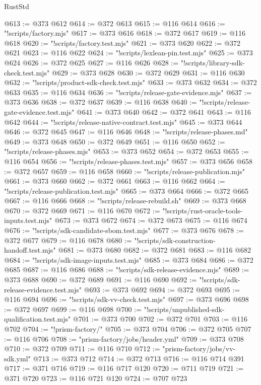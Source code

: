 \begin{lexlean}{RustStd}
\begin{coremodule}
@613 := @373 @612
@614 := @372 @613
@615 := @116 @614
@616 := "!scripts/factory.mjs"
@617 := @373 @616
@618 := @372 @617
@619 := @116 @618
@620 := "!scripts/factory.test.mjs"
@621 := @373 @620
@622 := @372 @621
@623 := @116 @622
@624 := "!scripts/lexlean-pin.test.mjs"
@625 := @373 @624
@626 := @372 @625
@627 := @116 @626
@628 := "!scripts/library-sdk-check.test.mjs"
@629 := @373 @628
@630 := @372 @629
@631 := @116 @630
@632 := "!scripts/product-sdk-check.test.mjs"
@633 := @373 @632
@634 := @372 @633
@635 := @116 @634
@636 := "!scripts/release-gate-evidence.mjs"
@637 := @373 @636
@638 := @372 @637
@639 := @116 @638
@640 := "!scripts/release-gate-evidence.test.mjs"
@641 := @373 @640
@642 := @372 @641
@643 := @116 @642
@644 := "!scripts/release-native-contract.test.mjs"
@645 := @373 @644
@646 := @372 @645
@647 := @116 @646
@648 := "!scripts/release-phases.md"
@649 := @373 @648
@650 := @372 @649
@651 := @116 @650
@652 := "!scripts/release-phases.mjs"
@653 := @373 @652
@654 := @372 @653
@655 := @116 @654
@656 := "!scripts/release-phases.test.mjs"
@657 := @373 @656
@658 := @372 @657
@659 := @116 @658
@660 := "!scripts/release-publication.mjs"
@661 := @373 @660
@662 := @372 @661
@663 := @116 @662
@664 := "!scripts/release-publication.test.mjs"
@665 := @373 @664
@666 := @372 @665
@667 := @116 @666
@668 := "!scripts/release-rebuild.sh"
@669 := @373 @668
@670 := @372 @669
@671 := @116 @670
@672 := "!scripts/rust-oracle-tools-inputs.test.mjs"
@673 := @373 @672
@674 := @372 @673
@675 := @116 @674
@676 := "!scripts/sdk-candidate-sbom.test.mjs"
@677 := @373 @676
@678 := @372 @677
@679 := @116 @678
@680 := "!scripts/sdk-construction-handoff.test.mjs"
@681 := @373 @680
@682 := @372 @681
@683 := @116 @682
@684 := "!scripts/sdk-image-inputs.test.mjs"
@685 := @373 @684
@686 := @372 @685
@687 := @116 @686
@688 := "!scripts/sdk-release-evidence.mjs"
@689 := @373 @688
@690 := @372 @689
@691 := @116 @690
@692 := "!scripts/sdk-release-evidence.test.mjs"
@693 := @373 @692
@694 := @372 @693
@695 := @116 @694
@696 := "!scripts/sdk-vv-check.test.mjs"
@697 := @373 @696
@698 := @372 @697
@699 := @116 @698
@700 := "!scripts/unpublished-sdk-qualification.test.mjs"
@701 := @373 @700
@702 := @372 @701
@703 := @116 @702
@704 := "!prism-factory/"
@705 := @373 @704
@706 := @372 @705
@707 := @116 @706
@708 := "prism-factory/jobs/header.yml"
@709 := @373 @708
@710 := @372 @709
@711 := @116 @710
@712 := "prism-factory/jobs/vv-sdk.yml"
@713 := @373 @712
@714 := @372 @713
@716 := @116 @714 @391
@717 := @371 @716
@719 := @116 @717 @120
@720 := @711 @719
@721 := @371 @720
@723 := @116 @721 @120
@724 := @707 @723

\end{coremodule}
\end{lexlean}
